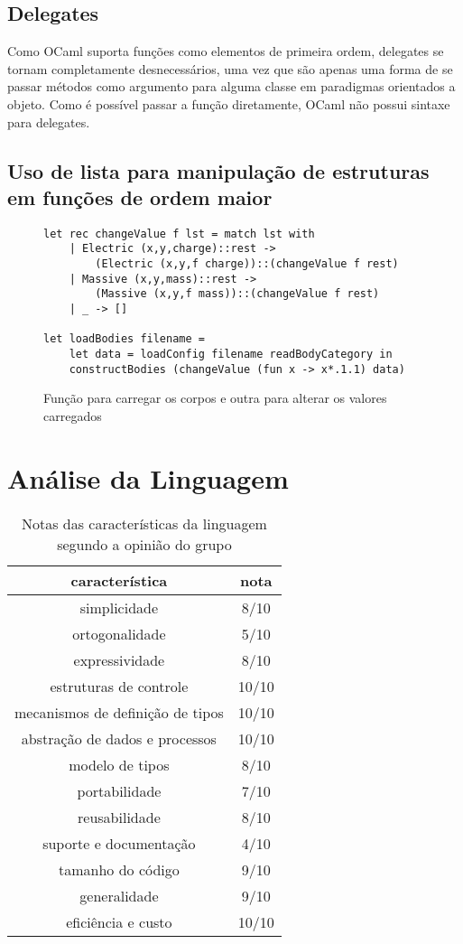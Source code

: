 \documentclass[a4paper,10pt]{article}
\begin{document}
\subsection{Delegates}
	
	Como OCaml suporta funções como elementos de primeira ordem, delegates se tornam completamente desnecessários, uma vez que são apenas uma forma de se passar métodos como argumento para alguma classe em paradigmas orientados a objeto. Como é possível passar a função diretamente, OCaml não possui sintaxe para delegates.
	
\subsection{Uso de lista para manipulação de estruturas em funções de ordem maior}
	
	\begin{figure}[H]
	\centering	
	\begin{lstlisting}
let rec changeValue f lst = match lst with
	| Electric (x,y,charge)::rest ->
		(Electric (x,y,f charge))::(changeValue f rest)
	| Massive (x,y,mass)::rest ->
		(Massive (x,y,f mass))::(changeValue f rest)
	| _ -> []

let loadBodies filename =
	let data = loadConfig filename readBodyCategory in
	constructBodies (changeValue (fun x -> x*.1.1) data)
	\end{lstlisting}
	\caption{Função para carregar os corpos e outra para alterar os valores carregados}
	\end{figure}

\section{Análise da Linguagem}

\begin{table}[H]
	\centering
 \begin{tabular}{c | c}
  \hline
  característica & nota \\
  \hline
  simplicidade & 8/10\\
  ortogonalidade & 5/10\\
  expressividade & 8/10\\  
  estruturas de controle & 10/10\\
  mecanismos de definição de tipos & 10/10\\
  abstração de dados e processos & 10/10\\
  modelo de tipos & 8/10\\
  portabilidade & 7/10\\
  reusabilidade & 8/10\\
  suporte e documentação & 4/10\\
  tamanho do código & 9/10\\
  generalidade & 9/10\\
  eficiência e custo & 10/10\\
  \hline
 \end{tabular}
	\caption{Notas das características da linguagem segundo a opinião do grupo}
\end{table}
\end{document}
